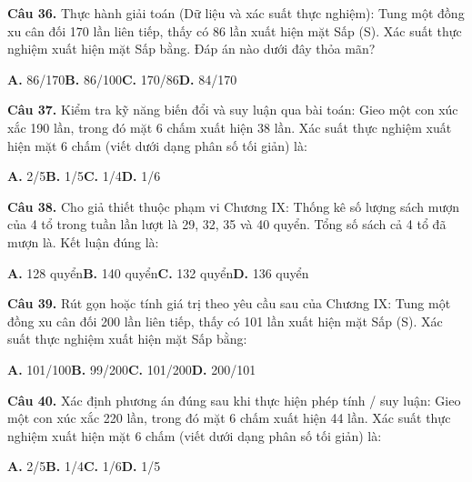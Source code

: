 \documentclass[11pt,a4paper]{article}
\begin{document}
\textbf{\color{primary} Câu 36.} Thực hành giải toán (Dữ liệu và xác suất thực nghiệm): Tung một đồng xu cân đối 170 lần liên tiếp, thấy có 86 lần xuất hiện mặt Sấp (S). Xác suất thực nghiệm xuất hiện mặt Sấp bằng. Đáp án nào dưới đây thỏa mãn?\par
\hspace*{1.5em}\textbf{A.} 86/170\quad\quad \textbf{B.} 86/100\quad\quad \textbf{C.} 170/86\quad\quad \textbf{D.} 84/170\par\vspace{2pt}
\textbf{\color{primary} Câu 37.} Kiểm tra kỹ năng biến đổi và suy luận qua bài toán: Gieo một con xúc xắc 190 lần, trong đó mặt 6 chấm xuất hiện 38 lần. Xác suất thực nghiệm xuất hiện mặt 6 chấm (viết dưới dạng phân số tối giản) là:\par
\hspace*{1.5em}\textbf{A.} 2/5\quad\quad \textbf{B.} 1/5\quad\quad \textbf{C.} 1/4\quad\quad \textbf{D.} 1/6\par\vspace{2pt}
\textbf{\color{primary} Câu 38.} Cho giả thiết thuộc phạm vi Chương IX: Thống kê số lượng sách mượn của 4 tổ trong tuần lần lượt là 29, 32, 35 và 40 quyển. Tổng số sách cả 4 tổ đã mượn là. Kết luận đúng là:\par
\hspace*{1.5em}\textbf{A.} 128 quyển\quad\quad \textbf{B.} 140 quyển\quad\quad \textbf{C.} 132 quyển\quad\quad \textbf{D.} 136 quyển\par\vspace{2pt}
\textbf{\color{primary} Câu 39.} Rút gọn hoặc tính giá trị theo yêu cầu sau của Chương IX: Tung một đồng xu cân đối 200 lần liên tiếp, thấy có 101 lần xuất hiện mặt Sấp (S). Xác suất thực nghiệm xuất hiện mặt Sấp bằng:\par
\hspace*{1.5em}\textbf{A.} 101/100\quad\quad \textbf{B.} 99/200\quad\quad \textbf{C.} 101/200\quad\quad \textbf{D.} 200/101\par\vspace{2pt}
\textbf{\color{primary} Câu 40.} Xác định phương án đúng sau khi thực hiện phép tính / suy luận: Gieo một con xúc xắc 220 lần, trong đó mặt 6 chấm xuất hiện 44 lần. Xác suất thực nghiệm xuất hiện mặt 6 chấm (viết dưới dạng phân số tối giản) là:\par
\hspace*{1.5em}\textbf{A.} 2/5\quad\quad \textbf{B.} 1/4\quad\quad \textbf{C.} 1/6\quad\quad \textbf{D.} 1/5\par\vspace{2pt}
\end{document}
